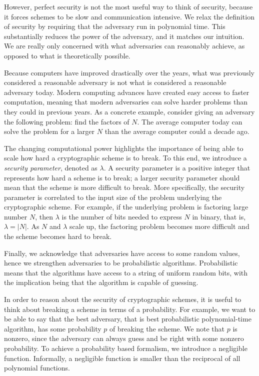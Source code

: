 However, perfect security is not the most useful way to think of security, because it forces schemes to be slow and communication intensive.
We relax the definition of security by requiring that the adversary run in polynomial time. 
This substantially reduces the power of the adversary, and it matches our intuition. 
We are really only concerned with what adversaries can reasonably achieve, as opposed to what is theoretically possible. 

Because computers have improved drastically over the years, what was previously considered a reasonable adversary is not what is considered a reasonable adversary today. 
Modern computing advances have created easy access to faster computation, meaning that modern adversaries can solve harder problems than they could in previous years. 
As a concrete example, consider giving an adversary the following problem: find the factors of $N$. 
The average computer today can solve the problem for a larger $N$ than the average computer could a decade ago.

The changing computational power highlights the importance of being able to scale how hard a cryptographic scheme is to break.
To this end, we introduce a \textit{security parameter}, denoted as $\lambda$.
A security parameter is a positive integer that represents how hard a scheme is to break; a larger security parameter should mean that the scheme is more difficult to break. 
More specifically, the security parameter is correlated to the input size of the problem underlying the cryptographic scheme. 
For example, if the underlying problem is factoring large number $N$, then $\lambda$ is the number of bits needed to express $N$ in binary, that is, $\lambda = |N|$.
As $N$ and $\lambda$ scale up, the factoring problem becomes more difficult and the scheme becomes hard to break. 

Finally, we acknowledge that adversaries have access to some random values, hence we strengthen adversaries to be probabilistic algorithms. 
Probabilistic means that the algorithms have access to a string of uniform random bits, with the implication being that the algorithm is capable of guessing. 

In order to reason about the security of cryptographic schemes, it is useful to think about breaking a scheme in terms of a probability. 
For example, we want to be able to say that the best adversary, that is best probabilistic polynomial-time algorithm, has some probability $p$ of breaking the scheme. 
We note that $p$ is nonzero, since the adversary can always guess and be right with some nonzero probability. 
To achieve a probability based formalism, we introduce a negligible function.
Informally, a negligible function is smaller than the reciprocal of all polynomial functions.

